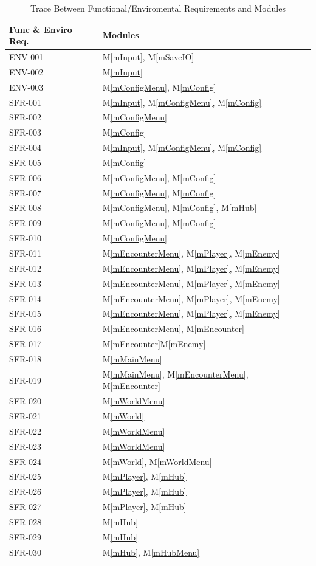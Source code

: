 \documentclass[12pt, titlepage]{article}
\newcommand{\mref}[1]{M\ref{#1}}
\begin{document}
\begin{table}[H]
\centering
\begin{tabular}{p{} p{}}
\toprule
\textbf{Func \& Enviro Req.} & \textbf{Modules}\\
\midrule
ENV-001 & \mref{mInput}, \mref{mSaveIO}\\
ENV-002 & \mref{mInput}\\
ENV-003 & \mref{mConfigMenu}, \mref{mConfig}\\
SFR-001 & \mref{mInput}, \mref{mConfigMenu}, \mref{mConfig}\\
SFR-002 & \mref{mConfigMenu}\\
SFR-003 & \mref{mConfig}\\
SFR-004 & \mref{mInput}, \mref{mConfigMenu}, \mref{mConfig}\\
SFR-005 & \mref{mConfig}\\
SFR-006 & \mref{mConfigMenu}, \mref{mConfig}\\
SFR-007 & \mref{mConfigMenu}, \mref{mConfig}\\
SFR-008 & \mref{mConfigMenu}, \mref{mConfig}, \mref{mHub}\\
SFR-009 & \mref{mConfigMenu}, \mref{mConfig}\\
SFR-010 & \mref{mConfigMenu}\\
SFR-011 & \mref{mEncounterMenu}, \mref{mPlayer}, \mref{mEnemy}\\
SFR-012 & \mref{mEncounterMenu}, \mref{mPlayer}, \mref{mEnemy}\\
SFR-013 & \mref{mEncounterMenu}, \mref{mPlayer}, \mref{mEnemy}\\
SFR-014 & \mref{mEncounterMenu}, \mref{mPlayer}, \mref{mEnemy}\\
SFR-015 & \mref{mEncounterMenu}, \mref{mPlayer}, \mref{mEnemy}\\
SFR-016 & \mref{mEncounterMenu}, \mref{mEncounter}\\
SFR-017 & \mref{mEncounter}\mref{mEnemy}\\
SFR-018 & \mref{mMainMenu}\\
SFR-019 & \mref{mMainMenu}, \mref{mEncounterMenu}, \mref{mEncounter}\\
SFR-020 & \mref{mWorldMenu} \\
SFR-021 & \mref{mWorld} \\
SFR-022 & \mref{mWorldMenu} \\
SFR-023 & \mref{mWorldMenu} \\
SFR-024 & \mref{mWorld}, \mref{mWorldMenu} \\
SFR-025 & \mref{mPlayer}, \mref{mHub}\\
SFR-026 & \mref{mPlayer}, \mref{mHub}\\
SFR-027 & \mref{mPlayer}, \mref{mHub}\\
SFR-028 & \mref{mHub}\\
SFR-029 & \mref{mHub}\\
SFR-030 & \mref{mHub}, \mref{mHubMenu}\\
\bottomrule
\end{tabular}
\caption{Trace Between Functional/Enviromental Requirements and Modules}
\label{TblRT}
\end{table}
\end{document}
